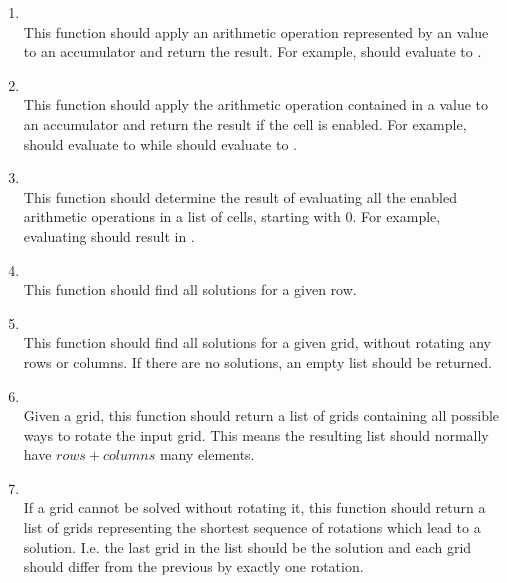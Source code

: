 \begin{enumerate}
	\item {}\\
	This function should apply an arithmetic operation represented by an  value to an accumulator and return the result. For example,  should evaluate to .
	
	\item {}\\
	This function should apply the arithmetic operation contained in a  value to an accumulator and return the result if the cell is enabled. For example,  should evaluate to  while  should evaluate to .
	
	\item {}\\
	This function should determine the result of evaluating all the enabled arithmetic operations in a list of cells, starting with $0$. For example, evaluating  should result in .
	
	\item {}\\
	This function should find all solutions for a given row.
	
	\item {}\\
	This function should find all solutions for a given grid, without rotating any rows or columns. If there are no solutions, an empty list should be returned.
	
	\item {}\\
	Given a grid, this function should return a list of grids containing all possible ways to rotate the input grid. This means the resulting list should normally have $\mathit{rows} + \mathit{columns}$ many elements.
	
	\item {}\\
	If a grid cannot be solved without rotating it, this function should return a list of grids representing the shortest sequence of rotations which lead to a solution. I.e. the last grid in the list should be the solution and each grid should differ from the previous by exactly one rotation.
\end{enumerate}

